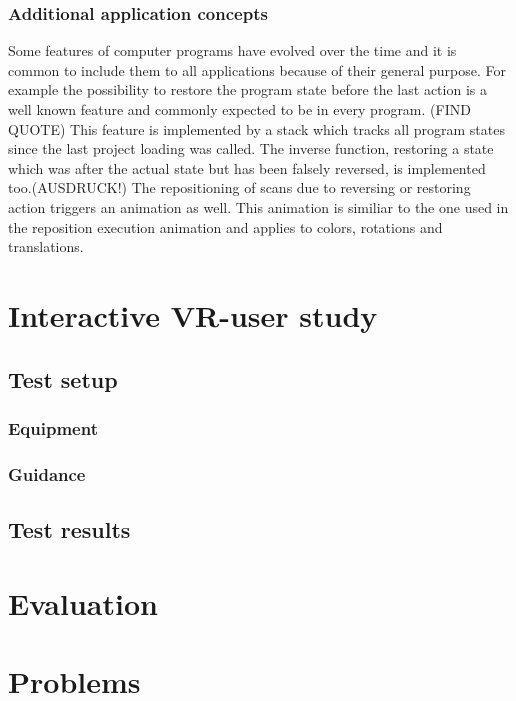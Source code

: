 \documentclass[hyperref,english,bachelorofscience,bibnum]{cgvpub}
\begin{document}
\subsection{Additional application concepts}

Some features of computer programs have evolved over the time and it is common to include them to all applications because of their general purpose. For example the possibility to restore the program state before the last action is a well known feature and commonly expected to be in every program. (FIND QUOTE)
This feature is implemented by a stack which tracks all program states since the last project loading was called. The inverse function, restoring a state which was after the actual state but has been falsely reversed, is implemented too.(AUSDRUCK!)
The repositioning of scans due to reversing or restoring action triggers an animation as well. This animation is similiar to the one used in the reposition execution animation and applies to colors, rotations and translations.

\chapter{Interactive VR-user study}

\section{Test setup}

\subsection{Equipment}
\subsection{Guidance}

\section{Test results}

\chapter{Evaluation}

\chapter{Problems}
\end{document}
